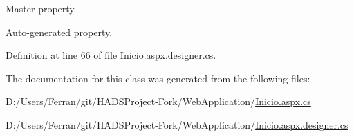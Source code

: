 Master property. 

Auto-\/generated property. 

Definition at line 66 of file Inicio.\+aspx.\+designer.\+cs.



The documentation for this class was generated from the following files\+:\begin{DoxyCompactItemize}
\item 
D\+:/\+Users/\+Ferran/git/\+H\+A\+D\+S\+Project-\/\+Fork/\+Web\+Application/\mbox{\hyperlink{Inicio_8aspx_8cs}{Inicio.\+aspx.\+cs}}\item 
D\+:/\+Users/\+Ferran/git/\+H\+A\+D\+S\+Project-\/\+Fork/\+Web\+Application/\mbox{\hyperlink{Inicio_8aspx_8designer_8cs}{Inicio.\+aspx.\+designer.\+cs}}\end{DoxyCompactItemize}
